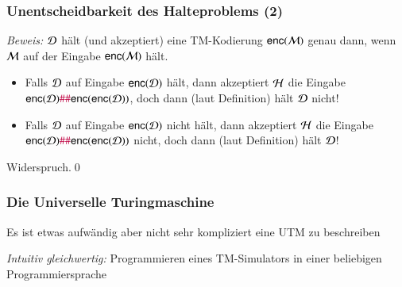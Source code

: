 \documentclass[onlymath]{beamer}
\begin{document}
\begin{frame}[t]\frametitle{Unentscheidbarkeit des Halteproblems (2)}


\emph{Beweis:} $\mathcal{D}$ hält (und akzeptiert) eine TM-Kodierung $\textsf{enc}(\mathcal{M})$ genau dann, wenn
$\mathcal{M}$ auf der Eingabe $\textsf{enc}(\mathcal{M})$  hält.\pause
\medskip

\pause
\begin{itemize}
\item Falls $\mathcal{D}$ auf Eingabe $\textsf{enc}(\mathcal{D})$ hält, dann akzeptiert $\mathcal{H}$
die Eingabe $\textsf{enc}(\mathcal{D})\mathtt{\textcolor{purple}{\#}}\mathtt{\textcolor{purple}{\#}}\textsf{enc}(\textsf{enc}(\mathcal{D}))$,
doch dann (laut Definition) hält $\mathcal{D}$ nicht!\pause
\item Falls $\mathcal{D}$ auf Eingabe $\textsf{enc}(\mathcal{D})$ nicht hält, dann akzeptiert $\mathcal{H}$
die Eingabe $\textsf{enc}(\mathcal{D})\mathtt{\textcolor{purple}{\#}}\mathtt{\textcolor{purple}{\#}}\textsf{enc}(\textsf{enc}(\mathcal{D}))$ nicht,
doch dann (laut Definition) hält $\mathcal{D}$!
\end{itemize}
Widerspruch.\qed

\end{frame}

\begin{frame}\frametitle{Die Universelle Turingmaschine}




Es ist etwas aufwändig aber nicht sehr kompliziert eine UTM zu beschreiben
\medskip

\emph{Intuitiv gleichwertig:} Programmieren eines TM-Simulators in einer beliebigen Programmiersprache

\end{frame}
\end{document}
